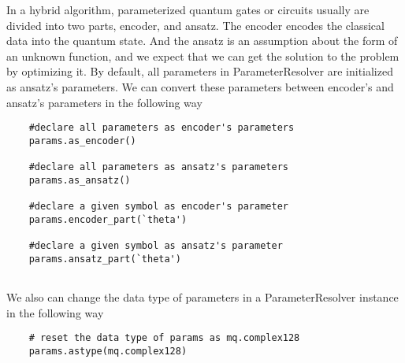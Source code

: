 In a hybrid algorithm, parameterized quantum gates or circuits usually are divided into two parts, encoder, and ansatz.
The encoder encodes the classical data into the quantum state. And the ansatz is an assumption about the form of an unknown function, and we expect that we can get the solution to the problem by optimizing it.
By default, all parameters in ParameterResolver are initialized as ansatz's parameters.
We can convert these parameters between encoder's and ansatz's parameters in the following way
\begin{lstlisting}
    #declare all parameters as encoder's parameters
    params.as_encoder()

    #declare all parameters as ansatz's parameters
    params.as_ansatz()

    #declare a given symbol as encoder's parameter
    params.encoder_part(`theta')
    
    #declare a given symbol as ansatz's parameter
    params.ansatz_part(`theta')
    
\end{lstlisting}

We also can change the data type of parameters in a ParameterResolver instance in the following way
\begin{lstlisting}
    # reset the data type of params as mq.complex128
    params.astype(mq.complex128)
\end{lstlisting}